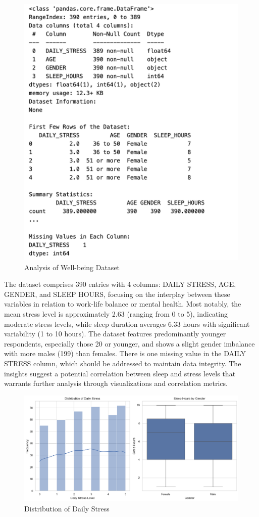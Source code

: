 \documentclass[runningheads]{llncs}
\begin{document}
\begin{enumerate}
\newpage
\begin{figure}
    \centering
    \includegraphics[width=.8\linewidth]{eda4.png}
    \caption{Analysis of Well-being Dataset} 
    \label{fig:enter-label}
\end{figure}

The dataset comprises 390 entries with 4 columns: DAILY STRESS, AGE, GENDER, and SLEEP HOURS, focusing on the interplay between these variables in relation to work-life balance or mental health. Most notably, the mean stress level is approximately 2.63 (ranging from 0 to 5), indicating moderate stress levels, while sleep duration averages 6.33 hours with significant variability (1 to 10 hours). The dataset features predominantly younger respondents, especially those 20 or younger, and shows a slight gender imbalance with more males (199) than females. There is one missing value in the DAILY STRESS column, which should be addressed to maintain data integrity. The insights suggest a potential correlation between sleep and stress levels that warrants further analysis through visualizations and correlation metrics.

\newpage
\begin{figure}
    \centering
    \includegraphics[width=1.2\linewidth]{eda5.png}
    \caption{Distribution of Daily Stress} 
    \label{fig:enter-label}
\end{figure}


\end{enumerate}
\end{document}
